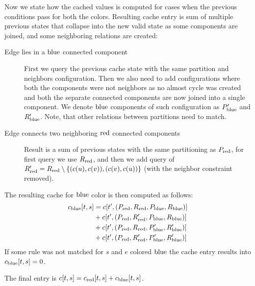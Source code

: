 Now we state how the cached values is computed for cases when
the previous conditions pass for both the colors.
Resulting cache entry is sum of multiple previous states that
collapse into the new valid state as some components are joined,
and some neighboring relations are created:
%
\begin{description}
	\item[Edge lies in a \( \text{blue} \) connected component]
	      First we query the previous cache state with
	      the same partition and neighbors configuration.
	      Then we also need to add configurations where
	      both the components were not neighbors as no almost cycle was created
	      and both the separate connected components
	      are now joined into a single component.
	      We denote \( \text{blue} \) components of such configuration
	      as \( P_{\text{blue}}^\prime \) and \( R_{\text{blue}}^\prime \).
	      Note, that other relations between partitions need to match.
	\item[Edge connects two neighboring \( \text{red} \) connected components]
	      Result is a sum of previous states with the same partitioning as \( P_{\text{red}} \),
	      for first query we use \( R_{\text{red}} \),
	      and then we add query of \( R^\prime_{\text{red}} = R_{\text{red}} \setminus \{(c(u), c(v)), (c(v), c(u))\} \)
	      (with the neighbor constraint removed).
\end{description}
%

The resulting cache for \( \text{blue} \) color is then computed as follows:
%
\begin{align}
	c_{\text{blue}}[t, s] & = c[t^\prime, (P_{\text{red}}, R_{\text{red}}, P_{\text{blue}}, R_{\text{blue}})]   \notag                      \\
	              & + c[t^\prime, (P_{\text{red}}, R_{\text{red}}^\prime, P_{\text{blue}}, R_{\text{blue}})]   \notag               \\
	              & + c[t^\prime, (P_{\text{red}}, R_{\text{red}}, P_{\text{blue}}^\prime, R_{\text{blue}}^\prime)]   \notag        \\
	              & + c[t^\prime, (P_{\text{red}}, R_{\text{red}}^\prime, P_{\text{blue}}^\prime, R_{\text{blue}}^\prime)]   \notag
\end{align}
%
If some rule was not matched for \( s \) and \( e \) colored \( \text{blue} \)
the cache entry results into \( c_{\text{blue}}[t, s] = 0 \).

The final entry is \( c[t, s] = c_{\text{red}}[t, s] + c_{\text{blue}}[t, s] \).

\subsection{\JoinNode}

